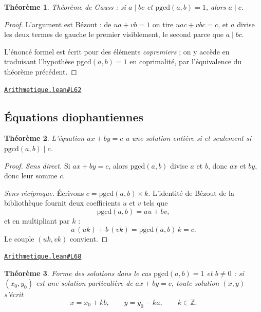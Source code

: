 \documentclass[11pt,a4paper]{article}
\theoremstyle{definition}
\theoremstyle{plain}
\newtheorem{theoreme}{Théorème}
\newcommand{\source}[2]{\par\smallskip\noindent\hfill{\footnotesize\href{#1}{\texttt{#2}}}\par\smallskip}
\begin{document}
\begin{theoreme}
Théorème de Gauss : si $a \mid bc$ et $\mathrm{pgcd}(a, b) = 1$, alors $a \mid c$.
\end{theoreme}

\begin{proof}
L'argument est Bézout : de $ua + vb = 1$ on tire $uac + vbc = c$, et $a$ divise
les deux termes de gauche \textemdash{} le premier visiblement, le second parce que
$a \mid bc$.

\medskip\noindent
L'énoncé formel est écrit pour des éléments \emph{copremiers} ; on y accède en traduisant
l'hypothèse $\mathrm{pgcd}(a, b) = 1$ en coprimalité, par l'équivalence du théorème
précédent.
\end{proof}
\source{https://github.com/Commutator-IO/learn-lean/blob/main/courses/02-lycee/10-specialite-mathematiques-terminale-s/Arithmetique.lean\#L62}{Arithmetique.lean\#L62}

\subsection{Équations diophantiennes}

\begin{theoreme}
L'équation $ax + by = c$ a une solution entière si et seulement si
$\mathrm{pgcd}(a, b) \mid c$.
\end{theoreme}

\begin{proof}
\emph{Sens direct.} Si $ax + by = c$, alors $\mathrm{pgcd}(a,b)$ divise $a$ et $b$, donc
$ax$ et $by$, donc leur somme $c$.

\emph{Sens réciproque.} Écrivons $c = \mathrm{pgcd}(a, b) \times k$. L'identité de Bézout
de la bibliothèque fournit deux coefficients $u$ et $v$ tels que
\[ \mathrm{pgcd}(a, b) = au + bv , \]
et en multipliant par $k$ :
\[ a\,(uk) + b\,(vk) = \mathrm{pgcd}(a, b)\,k = c . \]
Le couple $(uk, vk)$ convient.
\end{proof}
\source{https://github.com/Commutator-IO/learn-lean/blob/main/courses/02-lycee/10-specialite-mathematiques-terminale-s/Arithmetique.lean\#L68}{Arithmetique.lean\#L68}

\begin{theoreme}
Forme des solutions dans le cas $\mathrm{pgcd}(a, b) = 1$ et $b \ne 0$ : si $(x_0, y_0)$
est une solution particulière de $ax + by = c$, toute solution $(x, y)$ s'écrit
\[ x = x_0 + kb , \qquad y = y_0 - ka , \qquad k \in \mathbb{Z} . \]
\end{theoreme}
\end{document}
